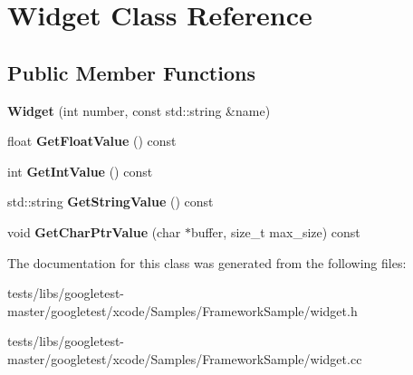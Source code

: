 \hypertarget{classWidget}{}\section{Widget Class Reference}
\label{classWidget}
\subsection*{Public Member Functions}
\begin{DoxyCompactItemize}
\item 
\mbox{\label{classWidget_ab573b75a8a69d29c298af2485fb9cda9}} 
{\bfseries Widget} (int number, const std\+::string \&name)
\item 
\mbox{\label{classWidget_abf639d975e02cabda8132873aca1a333}} 
float {\bfseries Get\+Float\+Value} () const
\item 
\mbox{\label{classWidget_a15e7d0423020a7a98063a749fb97bdd3}} 
int {\bfseries Get\+Int\+Value} () const
\item 
\mbox{\label{classWidget_a7a6e3a7fca3a9373f631c94dc1494d22}} 
std\+::string {\bfseries Get\+String\+Value} () const
\item 
\mbox{\label{classWidget_a50791a556979f22f5593383143c7f815}} 
void {\bfseries Get\+Char\+Ptr\+Value} (char $\ast$buffer, size\+\_\+t max\+\_\+size) const
\end{DoxyCompactItemize}


The documentation for this class was generated from the following files\+:\begin{DoxyCompactItemize}
\item 
tests/libs/googletest-\/master/googletest/xcode/\+Samples/\+Framework\+Sample/widget.\+h\item 
tests/libs/googletest-\/master/googletest/xcode/\+Samples/\+Framework\+Sample/widget.\+cc\end{DoxyCompactItemize}
